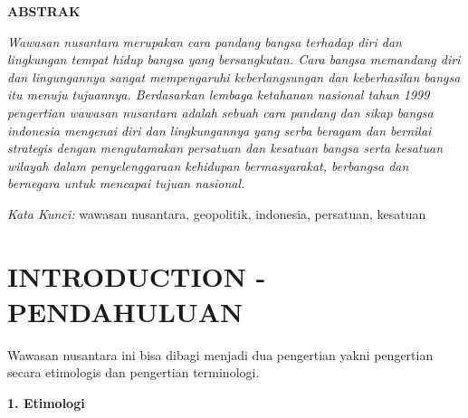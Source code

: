 \documentclass[12pt, a4paper]{article}
\newcommand{\makecustomsectiontitle}[1]{{\centering\normalfont\fontsize{11}{13}\selectfont\bfseries\MakeUppercase{#1}\par}\vspace{1em}\nopagebreak}
\begin{document}
\makecustomsectiontitle{ABSTRAK}
\singlespacing %
\begin{justify}
\fontsize{10}{12}\selectfont\itshape %
Wawasan nusantara merupakan cara pandang bangsa terhadap diri dan lingkungan tempat hidup bangsa yang bersangkutan. Cara bangsa memandang diri dan lingungannya sangat mempengaruhi keberlangsungan dan keberhasilan bangsa itu menuju tujuannya. Berdasarkan lembaga ketahanan nasional tahun 1999 pengertian wawasan nusantara adalah sebuah cara pandang dan sikap bangsa indonesia mengenai diri dan lingkungannya yang serba beragam dan bernilai strategis dengan mengutamakan persatuan dan kesatuan bangsa serta kesatuan wilayah dalam penyelenggaraan kehidupan bermasyarakat, berbangsa dan bernegara untuk mencapai tujuan nasional.
\par\vspace{0.5em}
\textit{Kata Kunci:} wawasan nusantara, geopolitik, indonesia, persatuan, kesatuan %
\end{justify}
\onehalfspacing %
\vspace{1cm}

\section*{INTRODUCTION - PENDAHULUAN}
\setlength{\parindent}{1em} %
Wawasan nusantara ini bisa dibagi menjadi dua pengertian yakni pengertian secara etimologis dan pengertian terminologi.

\textbf{1. Etimologi}
\end{document}
